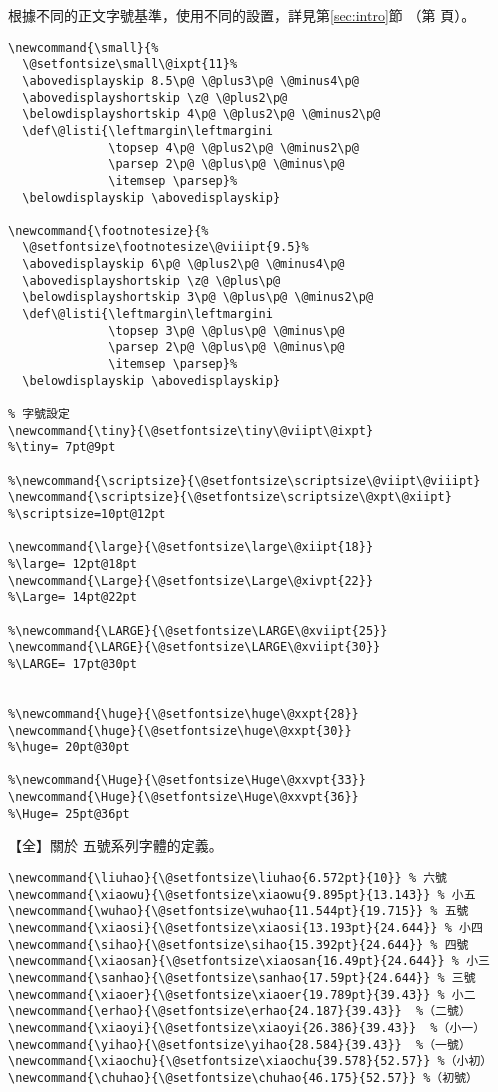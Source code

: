 \par 根據不同的正文字號基準，使用不同的設置，詳見第\ref{sec:intro}節
（第\pageref{sec:intro} 頁）。
\begin{lstlisting}[firstnumber=137]
\newcommand{\small}{%
  \@setfontsize\small\@ixpt{11}%
  \abovedisplayskip 8.5\p@ \@plus3\p@ \@minus4\p@
  \abovedisplayshortskip \z@ \@plus2\p@
  \belowdisplayshortskip 4\p@ \@plus2\p@ \@minus2\p@
  \def\@listi{\leftmargin\leftmargini
              \topsep 4\p@ \@plus2\p@ \@minus2\p@
              \parsep 2\p@ \@plus\p@ \@minus\p@
              \itemsep \parsep}%
  \belowdisplayskip \abovedisplayskip}

\newcommand{\footnotesize}{%
  \@setfontsize\footnotesize\@viiipt{9.5}%
  \abovedisplayskip 6\p@ \@plus2\p@ \@minus4\p@
  \abovedisplayshortskip \z@ \@plus\p@
  \belowdisplayshortskip 3\p@ \@plus\p@ \@minus2\p@
  \def\@listi{\leftmargin\leftmargini
              \topsep 3\p@ \@plus\p@ \@minus\p@
              \parsep 2\p@ \@plus\p@ \@minus\p@
              \itemsep \parsep}%
  \belowdisplayskip \abovedisplayskip}

% 字號設定
\newcommand{\tiny}{\@setfontsize\tiny\@viipt\@ixpt}					    %\tiny= 7pt@9pt

%\newcommand{\scriptsize}{\@setfontsize\scriptsize\@viipt\@viiipt}
\newcommand{\scriptsize}{\@setfontsize\scriptsize\@xpt\@xiipt} %\scriptsize=10pt@12pt

\newcommand{\large}{\@setfontsize\large\@xiipt{18}}				      %\large= 12pt@18pt
\newcommand{\Large}{\@setfontsize\Large\@xivpt{22}}				      %\Large= 14pt@22pt

%\newcommand{\LARGE}{\@setfontsize\LARGE\@xviipt{25}}
\newcommand{\LARGE}{\@setfontsize\LARGE\@xviipt{30}}  			    %\LARGE= 17pt@30pt


%\newcommand{\huge}{\@setfontsize\huge\@xxpt{28}}
\newcommand{\huge}{\@setfontsize\huge\@xxpt{30}}    				    %\huge= 20pt@30pt

%\newcommand{\Huge}{\@setfontsize\Huge\@xxvpt{33}}
\newcommand{\Huge}{\@setfontsize\Huge\@xxvpt{36}}   				    %\Huge= 25pt@36pt
\end{lstlisting}

\par 【全】關於 五號系列字體的定義。
\begin{lstlisting}[firstnumber=177]
\newcommand{\liuhao}{\@setfontsize\liuhao{6.572pt}{10}} % 六號
\newcommand{\xiaowu}{\@setfontsize\xiaowu{9.895pt}{13.143}} % 小五
\newcommand{\wuhao}{\@setfontsize\wuhao{11.544pt}{19.715}} % 五號
\newcommand{\xiaosi}{\@setfontsize\xiaosi{13.193pt}{24.644}} % 小四
\newcommand{\sihao}{\@setfontsize\sihao{15.392pt}{24.644}} % 四號
\newcommand{\xiaosan}{\@setfontsize\xiaosan{16.49pt}{24.644}} % 小三
\newcommand{\sanhao}{\@setfontsize\sanhao{17.59pt}{24.644}} % 三號
\newcommand{\xiaoer}{\@setfontsize\xiaoer{19.789pt}{39.43}} % 小二
\newcommand{\erhao}{\@setfontsize\erhao{24.187}{39.43}}  %（二號）
\newcommand{\xiaoyi}{\@setfontsize\xiaoyi{26.386}{39.43}}  %（小一）
\newcommand{\yihao}{\@setfontsize\yihao{28.584}{39.43}}  %（一號）
\newcommand{\xiaochu}{\@setfontsize\xiaochu{39.578}{52.57}} %（小初）
\newcommand{\chuhao}{\@setfontsize\chuhao{46.175}{52.57}} %（初號）
\end{lstlisting}


